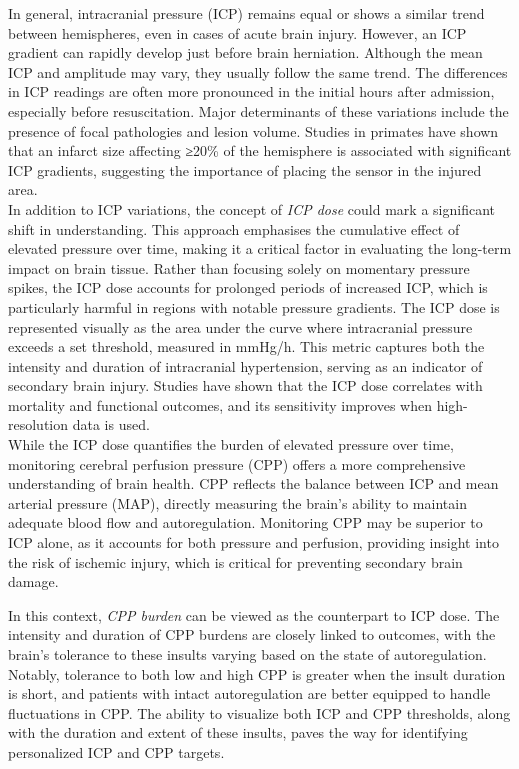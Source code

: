In general, intracranial pressure (ICP) remains equal or shows a similar trend between hemispheres, even in cases of acute brain injury. However, an ICP gradient can rapidly develop just before brain herniation. Although the mean ICP and amplitude may vary, they usually follow the same trend. The differences in ICP readings are often more pronounced in the initial hours after admission, especially before resuscitation. Major determinants of these variations include the presence of focal pathologies and lesion volume. Studies in primates have shown that an infarct size affecting ≥20\% of the hemisphere is associated with significant ICP gradients, suggesting the importance of placing the sensor in the injured area\cite{dambrosioInterhemisphericIntracranialPressure2002}.\\


In addition to ICP variations, the concept of \textit {ICP dose} could mark a significant shift in understanding. This approach emphasises the cumulative effect of elevated pressure over time, making it a critical factor in evaluating the long-term impact on brain tissue. Rather than focusing solely on momentary pressure spikes, the ICP dose accounts for prolonged periods of increased ICP, which is particularly harmful in regions with notable pressure gradients.
The ICP dose is represented visually as the area under the curve where intracranial pressure exceeds a set threshold, measured in mmHg/h. This metric captures both the intensity and duration of intracranial hypertension, serving as an indicator of secondary brain injury. Studies have shown that the ICP dose correlates with mortality and functional outcomes, and its sensitivity improves when high-resolution data is used\cite{schonenberg-tuPressureTimeDose2023}.\\

While the ICP dose quantifies the burden of elevated pressure over time, monitoring cerebral perfusion pressure (CPP) offers a more comprehensive understanding of brain health. CPP reflects the balance between ICP and mean arterial pressure (MAP), directly measuring the brain’s ability to maintain adequate blood flow and autoregulation. Monitoring CPP may be superior to ICP alone, as it accounts for both pressure and perfusion, providing insight into the risk of ischemic injury, which is critical for preventing secondary brain damage. 

In this context, \textit {CPP burden}\cite{zoerleAccuracyManualIntracranial2023a} can be viewed as the counterpart to ICP dose. The intensity and duration of CPP burdens are closely linked to outcomes, with the brain’s tolerance to these insults varying based on the state of autoregulation. Notably, tolerance to both low and high CPP is greater when the insult duration is short, and patients with intact autoregulation are better equipped to handle fluctuations in CPP\cite{guizaCerebralPerfusionPressure2017}. The ability to visualize both ICP and CPP thresholds, along with the duration and extent of these insults, paves the way for identifying personalized ICP and CPP targets.\\

